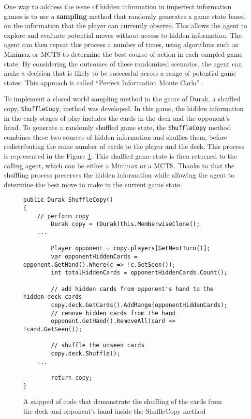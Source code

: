 One way to address the issue of hidden information in imperfect information games is to use a \textbf{sampling} method that randomly generates a game state based on the information that the player can currently observe. This allows the agent to explore and evaluate potential moves without access to hidden information. The agent can then repeat this process a number of times, using algorithms such as Minimax or MCTS to determine the best course of action in each sampled game state. By considering the outcomes of these randomized scenarios, the agent can make a decision that is likely to be successful across a range of potential game states. This approach is called  ``Perfect Information Monte Carlo'' \citep{PerfectInformationMC}.

To implement a closed world sampling method in the game of Durak, a shuffled copy, \texttt{ShuffleCopy}, method was developed. In this game, the hidden information in the early stages of play includes the cards in the deck and the opponent's hand. To generate a randomly shuffled game state, the \texttt{ShuffleCopy} method combines these two sources of hidden information and shuffles them, before redistributing the same number of cards to the player and the deck. This process is represented in the Figure \ref{fig:shuffleCopy}. This shuffled game state is then returned to the calling agent, which can be either a Minimax or a MCTS. Thanks to that the shuffling process preserves the hidden information while allowing the agent to determine the best move to make in the current game state.

\begin{figure}[h]
\captionsetup{justification=centering}
\begin{lstlisting}
public Durak ShuffleCopy()
{
	// perform copy
    	Durak copy = (Durak)this.MemberwiseClone();
	...
	
    	Player opponent = copy.players[GetNextTurn()];
    	var opponentHiddenCards = opponent.GetHand().Where(c => !c.GetSeen());
    	int totalHiddenCards = opponentHiddenCards.Count();

    	// add hidden cards from opponent's hand to the hidden deck cards
    	copy.deck.GetCards().AddRange(opponentHiddenCards);
    	// remove hidden cards from the hand
    	opponent.GetHand().RemoveAll(card => !card.GetSeen());

    	// shuffle the unseen cards 
    	copy.deck.Shuffle();
	...
	
    	return copy;
}
\end{lstlisting}
\caption{A snipped of code that demonstrate the shuffling of the cards from the deck and opponent's hand inside the ShuffleCopy method}
\label{fig:shuffleCopy}
\end{figure}

